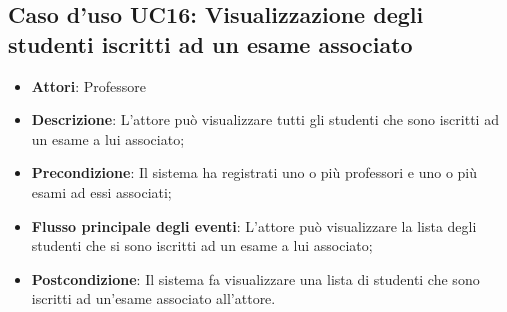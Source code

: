 \subsection{Caso d'uso \texorpdfstring{UC16}{UC16}: Visualizzazione degli studenti iscritti ad un esame associato}
\begin{itemize}
\item \textbf{Attori}: Professore
\item \textbf{Descrizione}: L'attore può visualizzare tutti gli studenti che sono iscritti ad un esame a lui associato;
\item \textbf{Precondizione}: Il sistema ha registrati uno o più professori e uno o più esami ad essi associati;
\item \textbf{Flusso principale degli eventi}: L'attore può visualizzare la lista degli studenti che si sono iscritti ad un esame a lui associato;
\item \textbf{Postcondizione}: Il sistema fa visualizzare una lista di studenti che sono iscritti ad un'esame associato all'attore.
\end{itemize}
